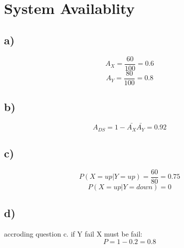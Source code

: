 \documentclass{article}
\begin{document}
\section*{System Availablity}
\subsection*{a)}
\[A_X=\frac{60}{100}=0.6\]
\[A_Y=\frac{80}{100}=0.8\]
\subsection*{b)}
\[A_{DS}=1-\bar{A_X}\bar{A_Y}=0.92\]
\subsection*{c)}
\[P(X=up|Y=up)=\frac{60}{80}=0.75\]
\[P(X=up|Y=down)=0\]
\subsection*{d)}
accroding question c. if Y fail X must be fail:
\[P=1-0.2=0.8\]
\end{document}
